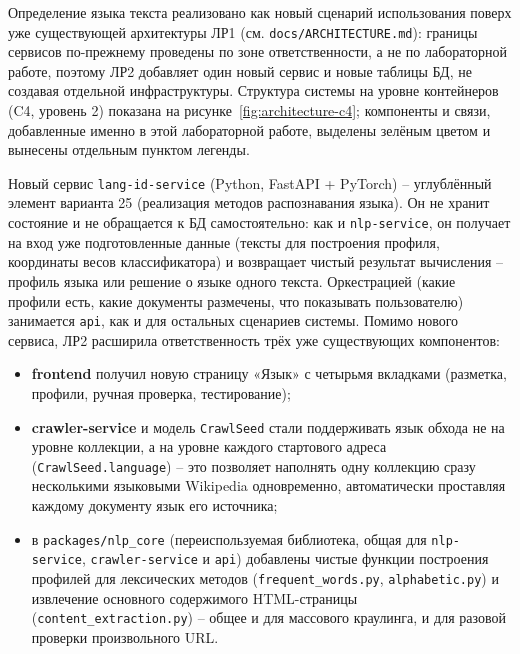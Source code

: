 

Определение языка текста реализовано как новый сценарий использования
поверх уже существующей архитектуры ЛР1 (см. \texttt{docs/ARCHITECTURE.md}):
границы сервисов по-прежнему проведены по зоне ответственности, а не по
лабораторной работе, поэтому ЛР2 добавляет один новый сервис и новые
таблицы БД, не создавая отдельной инфраструктуры. Структура системы на
уровне контейнеров (C4, уровень 2) показана на
рисунке~\ref{fig:architecture-c4}; компоненты и связи, добавленные
именно в этой лабораторной работе, выделены зелёным цветом и вынесены
отдельным пунктом легенды.


Новый сервис \texttt{lang-id-service} (Python, FastAPI + PyTorch) --
углублённый элемент варианта 25 (реализация методов распознавания
языка). Он не хранит состояние и не обращается к БД самостоятельно: как
и \texttt{nlp-service}, он получает на вход уже подготовленные данные
(тексты для построения профиля, координаты весов классификатора) и
возвращает чистый результат вычисления -- профиль языка или решение о
языке одного текста. Оркестрацией (какие профили есть, какие документы
размечены, что показывать пользователю) занимается \texttt{api}, как и
для остальных сценариев системы. Помимо нового сервиса, ЛР2 расширила
ответственность трёх уже существующих компонентов:
\begin{itemize}
  \item \textbf{frontend} получил новую страницу «Язык» с четырьмя
  вкладками (разметка, профили, ручная проверка, тестирование);
  \item \textbf{crawler-service} и модель \texttt{CrawlSeed} стали
  поддерживать язык обхода не на уровне коллекции, а на уровне каждого
  стартового адреса (\texttt{CrawlSeed.language}) -- это позволяет
  наполнять одну коллекцию сразу несколькими языковыми Wikipedia
  одновременно, автоматически проставляя каждому документу язык его
  источника;
  \item в \texttt{packages/nlp\_core} (переиспользуемая библиотека,
  общая для \texttt{nlp-service}, \texttt{crawler-service} и
  \texttt{api}) добавлены чистые функции построения профилей для
  лексических методов (\texttt{frequent\_words.py}, \texttt{alphabetic.py})
  и извлечение основного содержимого HTML-страницы
  (\texttt{content\_extraction.py}) -- общее и для массового краулинга, и
  для разовой проверки произвольного URL.
\end{itemize}

